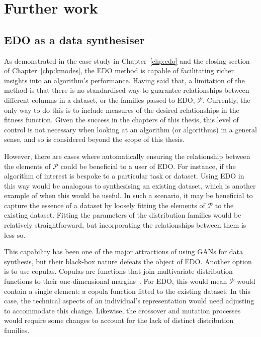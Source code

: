 \section{Further work}

\subsection*{EDO as a data synthesiser}

As demonstrated in the case study in Chapter~\ref{chp:edo} and the closing
section of Chapter~\ref{chp:kmodes}, the EDO method is capable of facilitating
richer insights into an algorithm's performance. Having said that, a limitation
of the method is that there is no standardised way to guarantee relationships
between different columns in a dataset, or the families passed to EDO,
\(\mathcal P\). Currently, the only way to do this is to include measures of the
desired relationships in the fitness function. Given the success in the chapters
of this thesis, this level of control is not necessary when looking at an
algorithm (or algorithms) in a general sense, and so is considered beyond the
scope of this thesis.

However, there are cases where automatically ensuring the relationship between
the elements of \(\mathcal P\) could be beneficial to a user of EDO. For
instance, if the algorithm of interest is bespoke to a particular task or
dataset. Using EDO in this way would be analogous to synthesising an existing
dataset, which is another example of when this would be useful. In such a
scenario, it may be beneficial to capture the essence of a dataset by loosely
fitting the elements of \(\mathcal P\) to the existing dataset. Fitting the
parameters of the distribution families would be relatively straightforward, but
incorporating the relationships between them is less so.

This capability has been one of the major attractions of using GANs for data
synthesis, but their black-box nature defeats the object of EDO. Another option
is to use copulas. Copulas are functions that join multivariate distribution
functions to their one-dimensional margins~\cite{Nelsen1999}. For EDO, this
would mean \(\mathcal P\) would contain a single element: a copula function
fitted to the existing dataset. In this case, the technical aspects of an
individual's representation would need adjusting to accommodate this change.
Likewise, the crossover and mutation processes would require some changes to
account for the lack of distinct distribution families.

